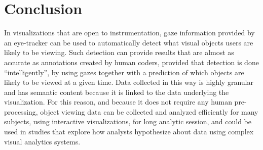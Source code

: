 \section{Conclusion}
In visualizations that are open to instrumentation, gaze information provided by an eye-tracker can be used to automatically detect what visual objects users are likely to be viewing. Such detection can provide results that are almost as accurate as annotations created by human coders, provided that detection is done ``intelligently'', by using gazes together with a prediction of which objects are likely to be viewed at a given time. Data collected in this way is highly granular and has semantic content because it is linked to the data underlying the visualization. For this reason, and because it does not require any human pre-processing, object viewing data can be collected and analyzed efficiently for many subjects, using interactive visualizations, for long analytic session, and could be used in studies that explore how analysts hypothesize about data using complex visual analytics systems. 